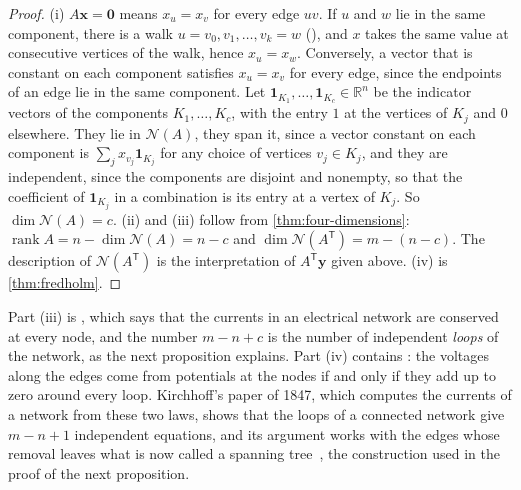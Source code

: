 \begin{proof}
(i) $A\mathbf x=\mathbf 0$ means $x_u=x_v$ for every edge $uv$. If $u$ and $w$ lie in the same component, there is a walk $u=v_0,v_1,\ldots,v_k=w$ (), and $x$ takes the same value at consecutive vertices of the walk, hence $x_u=x_w$. Conversely, a vector that is constant on each component satisfies $x_u=x_v$ for every edge, since the endpoints of an edge lie in the same component. Let $\mathbf 1_{K_1},\ldots,\mathbf 1_{K_c}\in\mathbb R^n$ be the indicator vectors of the components $K_1,\ldots,K_c$, with the entry $1$ at the vertices of $K_j$ and $0$ elsewhere. They lie in $\mathcal N(A)$, they span it, since a vector constant on each component is $\sum_jx_{v_j}\mathbf 1_{K_j}$ for any choice of vertices $v_j\in K_j$, and they are independent, since the components are disjoint and nonempty, so that the coefficient of $\mathbf 1_{K_j}$ in a combination is its entry at a vertex of $K_j$. So $\dim\mathcal N(A)=c$. (ii) and (iii) follow from \cref{thm:four-dimensions}: $\operatorname{rank}A=n-\dim\mathcal N(A)=n-c$ and $\dim\mathcal N(A^{\mathsf T})=m-(n-c)$. The description of $\mathcal N(A^{\mathsf T})$ is the interpretation of $A^{\mathsf T}\mathbf y$ given above. (iv) is \cref{thm:fredholm}.
\end{proof}

Part (iii) is , which says that the currents in an electrical network are conserved at every node, and the number $m-n+c$ is the number of independent \emph{loops} of the network, as the next proposition explains. Part (iv) contains : the voltages along the edges come from potentials at the nodes if and only if they add up to zero around every loop. Kirchhoff's paper of 1847, which computes the currents of a network from these two laws, shows that the loops of a connected network give $m-n+1$ independent equations, and its argument works with the edges whose removal leaves what is now called a spanning tree~\cite{kirchhoff1847,kirby2016}, the construction used in the proof of the next proposition.

